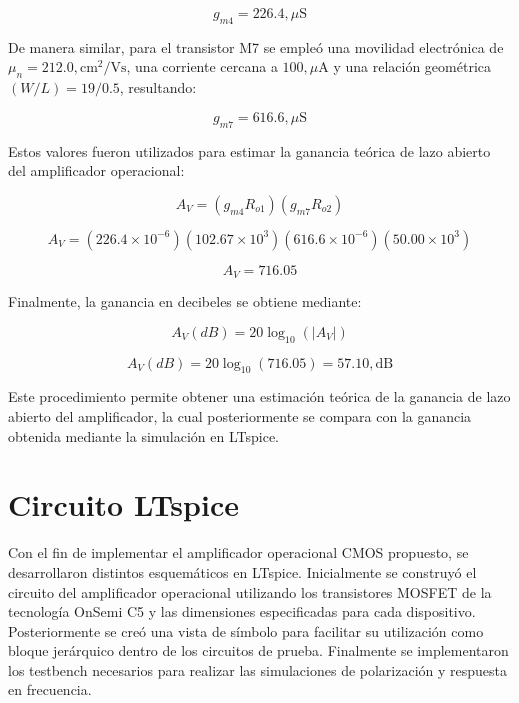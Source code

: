 \documentclass[journal]{IEEEtran}
\begin{document}
\begin{equation}
g_{m4}=226.4,\mu\text{S}
\end{equation}

De manera similar, para el transistor M7 se empleó una movilidad electrónica de $\mu_n=212.0,\text{cm}^2/\text{Vs}$, una corriente cercana a $100,\mu\text{A}$ y una relación geométrica $(W/L)=19/0.5$, resultando:

\begin{equation}
g_{m7}=616.6,\mu\text{S}
\end{equation}

Estos valores fueron utilizados para estimar la ganancia teórica de lazo abierto del amplificador operacional:

\begin{equation}
A_V=
(g_{m4}R_{o1})(g_{m7}R_{o2})
\end{equation}

\begin{equation}
A_V=
(226.4\times10^{-6})(102.67\times10^{3})
(616.6\times10^{-6})(50.00\times10^{3})
\end{equation}

\begin{equation}
A_V=716.05
\end{equation}

Finalmente, la ganancia en decibeles se obtiene mediante:

\begin{equation}
A_V(dB)=20\log_{10}(|A_V|)
\end{equation}

\begin{equation}
A_V(dB)=20\log_{10}(716.05)=57.10,\text{dB}
\end{equation}

Este procedimiento permite obtener una estimación teórica de la ganancia de lazo abierto del amplificador, la cual posteriormente se compara con la ganancia obtenida mediante la simulación en LTspice.


\section{Circuito LTspice}

Con el fin de implementar el amplificador operacional CMOS propuesto, se desarrollaron distintos esquemáticos en LTspice. Inicialmente se construyó el circuito del amplificador operacional utilizando los transistores MOSFET de la tecnología OnSemi C5 y las dimensiones especificadas para cada dispositivo. Posteriormente se creó una vista de símbolo para facilitar su utilización como bloque jerárquico dentro de los circuitos de prueba. Finalmente se implementaron los testbench necesarios para realizar las simulaciones de polarización y respuesta en frecuencia.
\end{document}
